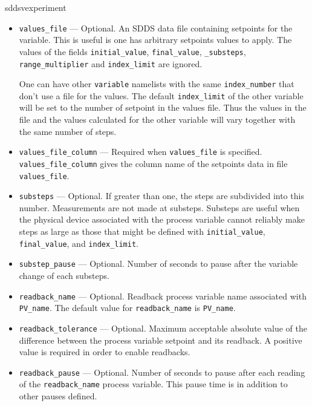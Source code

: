\begin{sddsprog}{sddsvexperiment}
\begin{itemize}
\begin{itemize}
   \item {\verb+values_file+} --- Optional. An SDDS data file
      containing setpoints for the variable.  This is useful is one
      has arbitrary setpoints values to apply.  The values of the
      fields {\verb+initial_value+}, {\verb+final_value+},
      {\verb+_substeps+}, {\verb+range_multiplier+} and
      {\verb+index_limit+} are ignored.

      One can have other \verb+variable+ namelists with the same
      \verb+index_number+ that don't use a file for the values.  The
      default {\verb+index_limit+} of the other variable will be set
      to the number of setpoint in the values file.  Thus the values
      in the file and the values calculated for the other variable
      will vary together with the same number of steps.

   \item {\verb+values_file_column+} --- Required when
      {\verb+values_file+} is specified.  {\verb+values_file_column+}
      gives the column name of the setpoints data in file
      {\verb+values_file+}.

   \item {\verb+substeps+} --- Optional. If greater than one, the
      steps are subdivided into this number.  Measurements are not
      made at substeps. Substeps are useful when the physical device
      associated with the process variable cannot reliably make steps
      as large as those that might be defined with
      {\verb+initial_value+}, {\verb+final_value+}, and
      {\verb+index_limit+}.

   \item {\verb+substep_pause+} --- Optional. Number of seconds to
      pause after the variable change of each substeps.

   \item {\verb+readback_name+} --- Optional. Readback process
      variable name associated with {\verb+PV_name+}. The default
      value for {\verb+readback_name+} is {\verb+PV_name+}.

   \item {\verb+readback_tolerance+} --- Optional. Maximum acceptable
      absolute value of the difference between the process variable
      setpoint and its readback. A positive value is required in order
      to enable readbacks.

   \item {\verb+readback_pause+} --- Optional. Number of seconds to
      pause after each reading of the {\verb+readback_name+} process
      variable.  This pause time is in addition to other pauses
      defined.


\end{itemize}
\end{itemize}
\end{sddsprog}
